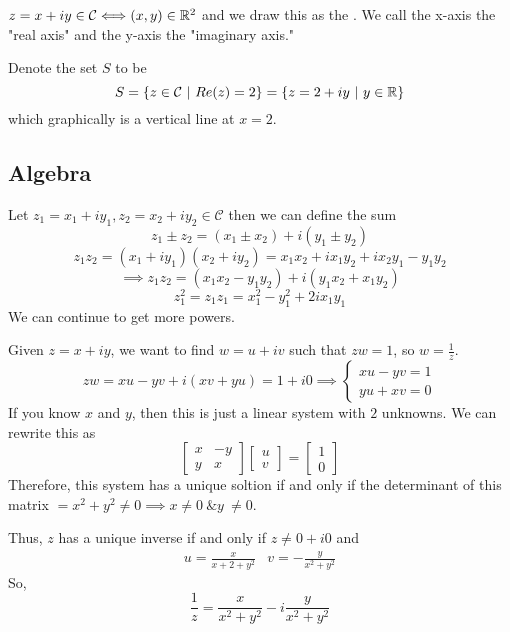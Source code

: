 \documentclass[12pt]{scrartcl}
\newcommand{\C}{\mathcal{C}}
\begin{document}
\begin{note}
  $z = x + iy \in \C \Longleftrightarrow (x, y) \in \RR^2$
  and we draw this as the . We call the 
  x-axis the "real axis" and the y-axis the "imaginary axis."
\end{note}

\begin{example}
  Denote the set $S$ to be
  \[S = \{z \in \C \ | \ Re(z) = 2\} = \{z = 2 + iy \ | \ y \in \RR\}\]
  which graphically is a vertical line at $x = 2$. 
\end{example}

\subsection{Algebra}

\begin{definition}
  Let $z_1 = x_1 + iy_1, z_2 = x_2 + iy_2 \in \C$ then we can define the sum 
  \[z_1 \pm z_2 = (x_1 \pm x_2) + i(y_1 \pm y_2)\]
  \[z_1z_2 = (x_1 + iy_1)(x_2 + iy_2) = x_1x_2 + ix_1y_2 + ix_2y_1 - y_1y_2\]
  \[\implies z_1z_2 = (x_1x_2 - y_1y_2) + i(y_1x_2 + x_1y_2)\]
  \[z_1^2 = z_1z_1 = x_1^2 - y_1^2 + 2ix_1y_1\]
  We can continue to get more powers.
\end{definition}

\begin{definition}[Inverse]
  Given $z = x + iy$, we want to find $w = u + iv$ such that $zw = 1$, so $w = \frac{1}{z}$.
  \[zw = xu - yv + i(xv + yu) = 1 + i0 \implies \begin{cases}
    xu - yv = 1\\
    yu + xv = 0
  \end{cases}\]
  If you know $x$ and $y$, then this is just a linear system with $2$ unknowns. We can rewrite this as 
  \[\begin{bmatrix}
    x & -y \\ y & x
  \end{bmatrix} \begin{bmatrix}
    u \\ v
  \end{bmatrix} = \begin{bmatrix}
    1 \\ 0
  \end{bmatrix}\]
  Therefore, this system has a unique soltion if and only if the determinant of this matrix $= x^2 + y^2 \neq 0 \implies x \neq 0 \ \& y \ \neq 0$. 

  Thus, $z$ has a unique inverse if and only if $z \neq 0 + i0$ and 
  \begin{align*}
    u = \frac{x}{x+2 + y^2} & v = -\frac{y}{x^2 + y^2}
  \end{align*}
  So, 
  \[\frac{1}{z} = \frac{x}{x^2 + y^2} - i\frac{y}{x^2 + y^2}\]
\end{definition}
\end{document}
